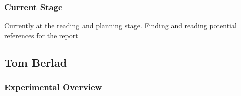 \documentclass[12pt]{article}
\newcommand{\PRLsep}{\noindent\makebox[\linewidth]{\resizebox{0.3333\linewidth}{1pt}{$\bullet$}}\bigskip}
\begin{document}
\subsubsection*{Current Stage}
Currently at the reading and planning stage. Finding and reading potential references for the report

\vspace{0.5cm}
\PRLsep
\newpage

\subsection*{Tom Berlad}
\subsubsection*{Experimental Overview}
\end{document}
